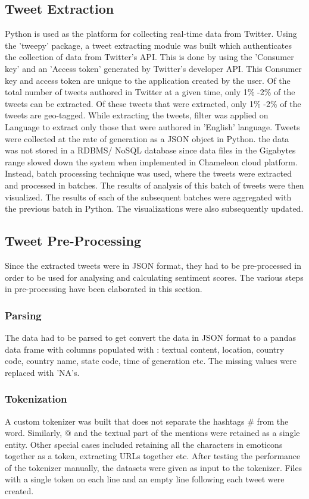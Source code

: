 \documentclass[9pt,twocolumn,twoside]{styles/osajnl}
\begin{document}
\subsection{Tweet Extraction}
Python is used as the platform for collecting real-time data from Twitter. Using the 'tweepy' package, a tweet extracting module was built which authenticates the collection of data from Twitter's API. This is done by using the 'Consumer key' and an 'Access token' generated by Twitter's developer API. This Consumer key and access token are unique to the application created by the user. Of the total number of tweets authored in Twitter at a given time, only 1\% -2\% of the tweets can be extracted. Of these tweets that were extracted, only 1\% -2\% of the tweets are geo-tagged. While extracting the tweets, filter was applied on Language to extract only those that were authored in 'English' language. Tweets were collected at the rate of generation as a JSON object in Python. the data was not stored in a RDBMS/ NoSQL database since data files in the Gigabytes range slowed down the system when implemented in Chameleon cloud platform. Instead, batch processing technique was used, where the tweets were extracted and processed in batches. The results of analysis of this batch of tweets were then visualized. The results of each of the subsequent batches were aggregated with the previous batch in Python. The visualizations were also subsequently updated. 
\subsection{Tweet Pre-Processing}
Since the extracted tweets were in JSON format, they had to be pre-processed in order to be used for analysing and calculating sentiment scores. The various steps in pre-processing have been elaborated in this section. 
\subsubsection{Parsing}
The data had to be parsed to get convert the data in JSON format to a pandas data frame with columns populated with : textual content, location, country code, country name, state code, time of generation etc. The missing values were replaced with 'NA's. 
\subsubsection{Tokenization}
A custom tokenizer was built that does not separate the hashtags $\#$ from the word. Similarly, $@$ and the textual part of the mentions were retained as a single entity. Other special cases included retaining all the characters in emoticons together as a token, extracting URLs together etc. After testing the performance of the tokenizer manually, the datasets were given as input to the tokenizer. Files with a single token on each line and an empty line following each tweet were created.
\end{document}
